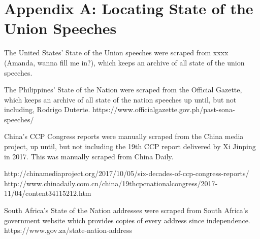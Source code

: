\documentclass[12pt]{article}
\begin{document}
\section{Appendix A: Locating State of the Union Speeches}
\label{sec:appa}

The United States' State of the Union speeches were scraped from xxxx (Amanda, wanna fill me in?), which keeps an archive of all state of the union speeches.

The Philippines' State of the Nation were scraped from the Official Gazette, which keeps an archive of all state of the nation speeches up until, but not including, Rodrigo Duterte.
https://www.officialgazette.gov.ph/past-sona-speeches/

China's CCP Congress reports were manually scraped from the China media project, up until, but not including the 19th CCP report delivered by Xi Jinping in 2017. This was manually scraped from China Daily.

http://chinamediaproject.org/2017/10/05/six-decades-of-ccp-congress-reports/
http://www.chinadaily.com.cn/china/19thcpcnationalcongress/2017-11/04/content\textunderscore34115212.htm

South Africa's State of the Nation addresses were scraped from South Africa's government website which provides copies of every address since independence.
https://www.gov.za/state-nation-address 

\singlespacing 


\end{document}
